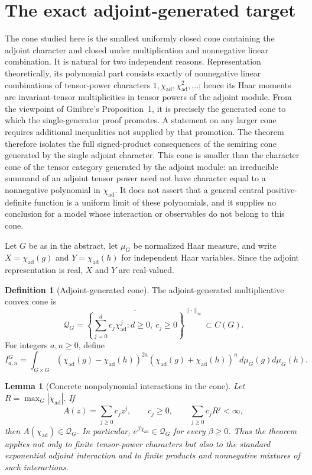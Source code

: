 \documentclass[11pt,reqno]{amsart}
\theoremstyle{plain}
\newtheorem{lemma}[theorem]{Lemma}
\theoremstyle{definition}
\newtheorem{definition}[theorem]{Definition}
\newcommand{\chiad}{\chi_{\mathrm{ad}}}
\newcommand{\Qcone}{\mathcal Q}
\begin{document}
\setcounter{section}{6}
\section{The exact adjoint-generated target}

The cone studied here is the smallest uniformly closed cone containing the
adjoint character and closed under multiplication and nonnegative linear
combination.  It is natural for two independent reasons.  Representation
theoretically, its polynomial part consists exactly of nonnegative linear
combinations of tensor-power characters
\(1,\chiad,\chiad^2,\ldots\); hence its Haar moments are invariant-tensor
multiplicities in tensor powers of the adjoint module.  From the viewpoint of
Ginibre's Proposition~1, it is precisely the generated cone to which the
single-generator proof promotes.  A statement on any larger cone requires
additional inequalities not supplied by that promotion.  The theorem
therefore isolates the full signed-product consequences of the semiring cone
generated by the single adjoint character.  This cone is smaller than the
character cone of the tensor category generated by the adjoint module: an
irreducible summand of an adjoint tensor power need not have character equal
to a nonnegative polynomial in \(\chiad\).  It does not
assert that a general central positive-definite function is a uniform limit
of these polynomials, and it supplies no conclusion for a model whose
interaction or observables do not belong to this cone.

Let $G$ be as in the abstract, let $\mu_G$ be normalized Haar measure, and
write $X=\chiad(g)$ and $Y=\chiad(h)$ for independent Haar variables.  Since
the adjoint representation is real, $X$ and $Y$ are real-valued.

\begin{definition}[Adjoint-generated cone]
The adjoint-generated multiplicative convex cone is
\[
 \Qcone_G=
 \overline{\left\{
   \sum_{j=0}^{d}c_j\chiad^j:
   d\geq0,\ c_j\geq0
 \right\}}^{\lVert\cdot\rVert_\infty}
 \subset C(G).
\]
For integers $a,n\geq0$, define
\[
 I^G_{a,n}
 =\int_{G\times G}
   (\chiad(g)-\chiad(h))^{2a}
   (\chiad(g)+\chiad(h))^n\,d\mu_G(g)d\mu_G(h).
\]
\end{definition}

\begin{lemma}[Concrete nonpolynomial interactions in the cone]
\label{lem:nonpolynomial-cone-examples}
Let \(R=\max_G|\chiad|\).  If
\[
 A(z)=\sum_{j\geq0}c_jz^j,
 \qquad c_j\geq0,
 \qquad \sum_{j\geq0}c_jR^j<\infty,
\]
then \(A(\chiad)\in\Qcone_G\).  In particular,
\(e^{\beta\chiad}\in\Qcone_G\) for every \(\beta\geq0\).
Thus the theorem applies not only to finite tensor-power characters but also
to the standard exponential adjoint interaction and to finite products and
nonnegative mixtures of such interactions.
\end{lemma}
\end{document}
